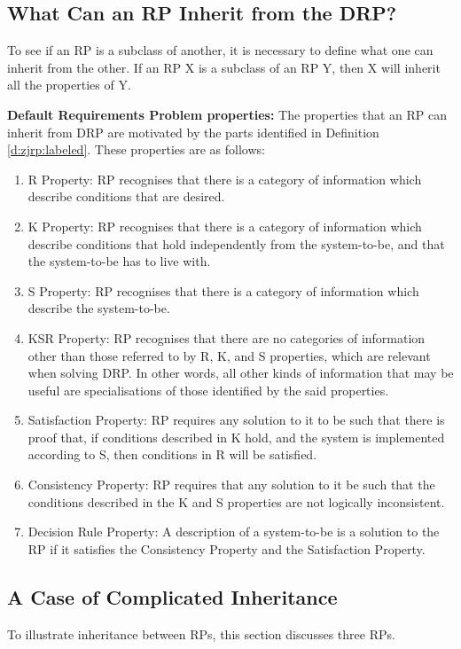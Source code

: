\documentclass[graybox]{svmult}
\newcommand{\xb}[1]{\textbf{#1}}
\newcommand{\xf}[1]{\textsf{#1}}
\newcommand{\RPfull}{Requirements Problem}
\newcommand{\RP}{RP}
\newcommand{\ZJRPfull}{Default \RPfull}
\newcommand{\ZJRP}{DRP}
\newcommand{\PrR}{\xf{R}}
\newcommand{\PrK}{\xf{K}}
\newcommand{\PrS}{\xf{S}}
\newcommand{\PrKSR}{\xf{KSR}}
\newcommand{\PrSatisfaction}{\xf{Satisfaction}}
\newcommand{\PrConsistency}{\xf{Consistency}}
\newcommand{\PrDR}{\xf{Decision Rule}}
\newcommand{\PropR}{\PrR{} Property}
\newcommand{\PropK}{\PrK{} Property}
\newcommand{\PropS}{\PrS{} Property}
\newcommand{\PropKSR}{\PrKSR{} Property}
\newcommand{\PropSatisfaction}{\PrSatisfaction{} Property}
\newcommand{\PropConsistency}{\PrConsistency{} Property}
\newcommand{\PropDR}{\PrDR{} Property}
\begin{document}
%
\subsection{What Can an \RP{} Inherit from the \ZJRP?}\label{s:uniqueness:properties}
To see if an \RP{} is a subclass of another, it is necessary to define what one can inherit from the other. If an \RP{} X is a subclass of an \RP{} Y, then X will inherit all the properties of Y.

\begin{definition}\label{d:zjrp:properties}
\xb{\ZJRPfull{} properties:} The properties that an \RP{} can inherit from \ZJRP{} are motivated by the parts identified in Definition \ref{d:zjrp:labeled}. These properties are as follows:
\begin{enumerate}
    \item{\PropR: \RP{} recognises that there is a category of information which describe conditions that are desired.}
    \item{\PropK: \RP{} recognises that there is a category of information which describe conditions that hold independently from the system-to-be, and that the system-to-be has to live with.}
    \item{\PropS: \RP{} recognises that there is a category of information which describe the system-to-be.}
    \item{\PropKSR: \RP{} recognises that there are no categories of information other than those referred to by \PrR, \PrK, and \PrS{} properties, which are relevant when solving \ZJRP. In other words, all other kinds of information that may be useful are specialisations of those identified by the said properties.}
    \item{\PropSatisfaction: \RP{} requires any solution to it to be such that there is proof that, if conditions described in \PrK{} hold, and the system is implemented according to \PrS, then conditions in \PrR{} will be satisfied.}
    \item{\PropConsistency: \RP{} requires that any solution to it be such that the conditions described in the \PrK{} and \PrS{} properties are not logically inconsistent.}
    \item{\PropDR: A description of a system-to-be is a solution to the \RP{} if it satisfies the \PropConsistency{} and the \PropSatisfaction.}
\end{enumerate}
\end{definition}


%
\subsection{A Case of Complicated Inheritance}\label{s:uniqueness:cases}
To illustrate inheritance between \RP s, this section discusses three \RP s. 
\end{document}
